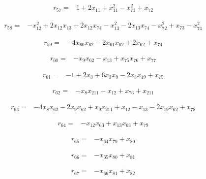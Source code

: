 \begin{align*}
r_{57}={}&1+2x_{11}+x_{11}^{2}-x_{71}^{2}+x_{72}
\end{align*}

\begin{align*}
r_{58}={}&-x_{12}^{2}+2x_{12}x_{13}+2x_{12}x_{74}-x_{13}^{2}-2x_{13}x_{74}-x_{72}^{2}+x_{73}-x_{74}^{2}
\end{align*}

\begin{align*}
r_{59}={}&-4x_{60}x_{62}-2x_{61}x_{62}+2x_{62}+x_{74}
\end{align*}

\begin{align*}
r_{60}={}&-x_{9}x_{62}-x_{13}+x_{75}x_{76}+x_{77}
\end{align*}

\begin{align*}
r_{61}={}&-1+2x_{3}+6x_{3}x_{9}-2x_{3}x_{19}+x_{75}
\end{align*}

\begin{align*}
r_{62}={}&-x_{8}x_{211}-x_{12}+x_{76}+x_{211}
\end{align*}

\begin{align*}
r_{63}={}&-4x_{8}x_{62}-2x_{9}x_{62}+x_{9}x_{211}+x_{12}-x_{13}-2x_{19}x_{62}+x_{78}
\end{align*}

\begin{align*}
r_{64}={}&-x_{12}x_{63}+x_{13}x_{63}+x_{79}
\end{align*}

\begin{align*}
r_{65}={}&-x_{64}x_{79}+x_{80}
\end{align*}

\begin{align*}
r_{66}={}&-x_{65}x_{80}+x_{81}
\end{align*}

\begin{align*}
r_{67}={}&-x_{66}x_{81}+x_{82}
\end{align*}


